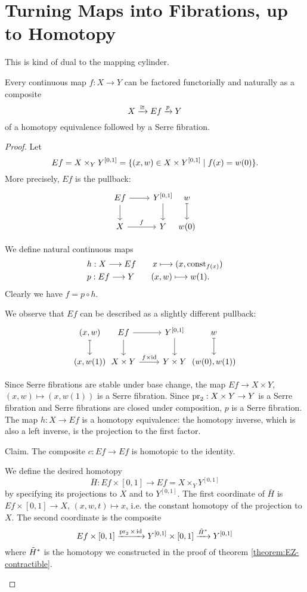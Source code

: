 \section{Turning Maps into Fibrations, up to Homotopy}

This is kind of dual to the mapping cylinder.

\begin{theorem}
Every continuous map $f:X\to Y$ can be factored functorially and naturally as a composite
\[X\xrightarrow{\cong}Ef\xrightarrow{p} Y\]
of a homotopy equivalence followed by a Serre fibration.
\end{theorem}

\begin{proof}
Let 
$$Ef=X\times_Y Y^{[0,1]}=\{(x,w)\in X\times Y^{[0,1]}\mid f(x)=w(0)\}.$$
More precisely, $Ef$ is the pullback:
\[\begin{tikzcd}
Ef \arrow[d] \arrow[r] & Y^{[0,1]} \arrow[d] &[-6ex] w \ar[d,mapsto] \\
X \arrow[r,"f"] & Y & w(0)
\end{tikzcd}\]

We define natural continuous maps 
\begin{align*}
    &h:X\longrightarrow Ef\qquad x\longmapsto (x,\operatorname{const}_{f(x)})\\
    &p:Ef\longrightarrow Y \qquad (x,w)\longmapsto w(1).
\end{align*}
Clearly we have $f=p\circ h$.

We observe that $Ef$ can be described as a slightly different pullback:
\[\begin{tikzcd}
(x,w) \ar[d,mapsto] &[-6ex] Ef \arrow[d] \arrow[r] & Y^{[0,1]} \arrow[d] &[-6ex] w \ar[d,mapsto]\\
(x,w(1)) & X\times Y \arrow[r,"f\times\id"] & Y\times Y & (w(0),w(1))
\end{tikzcd}\]

Since Serre fibrations are stable under base change, the map $Ef\to X\times Y$, $(x,w)\mapsto(x,w(1))$ is a Serre fibration. Since $\operatorname{pr}_2:X\times Y\to Y$ is a Serre fibration and Serre fibrations are closed under composition, $p$ is a Serre fibration. 
The map $h:X\to Ef$ is a homotopy equivalence: the homotopy inverse, which is also a left inverse, is the projection to the first factor.

Claim. The composite $c:Ef\to Ef$ is homotopic to the identity.

\begin{claimproof}
We define the desired homotopy
\[\bar H:Ef\times[0,1]\to Ef=X\times_Y Y^{[0,1]}\]
by specifying its projections to $X$ and to $Y^{[0,1]}$. The first coordinate of $\bar H$ is $Ef\times[0,1]\to X$, $(x,w,t)\mapsto x$, i.e. the constant homotopy of the projection to $X$. The second coordinate is the composite
\[Ef\times[0,1]\xrightarrow{\operatorname{pr}_2\times\operatorname{id}} Y^{[0,1]}\times [0,1]\xrightarrow{\tilde H^*} Y^{[0,1]}\]
where $\tilde H^*$ is the homotopy we constructed in the proof of theorem \ref{theorem:EZ-contractible}.


\end{claimproof}
\end{proof}
